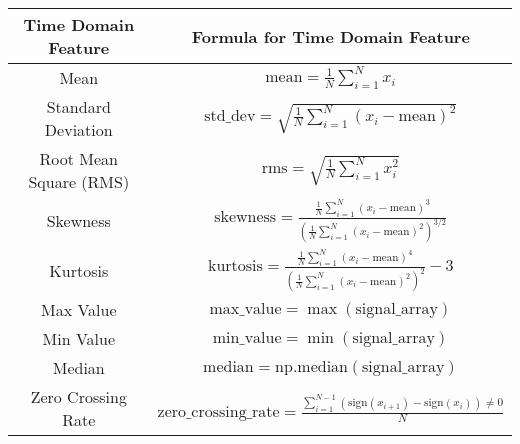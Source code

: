 \begin{table}[h]
    \centering
    \begin{tabular}{|c|c|}
        \hline
        \textbf{Time Domain Feature} & \textbf{Formula for Time Domain Feature}                                                                                                         \\
        \hline
        Mean                         & $\text{mean} = \frac{1}{N} \sum_{i=1}^{N} x_i$                                                                                                   \\
        \hline
        Standard Deviation           & $\text{std\_dev} = \sqrt{\frac{1}{N} \sum_{i=1}^{N} (x_i - \text{mean})^2}$                                                                      \\
        \hline
        Root Mean Square (RMS)       & $\text{rms} = \sqrt{\frac{1}{N} \sum_{i=1}^{N} x_i^2}$                                                                                           \\
        \hline
        Skewness                     & $\text{skewness} = \frac{\frac{1}{N} \sum_{i=1}^{N} (x_i - \text{mean})^3}{\left(\frac{1}{N} \sum_{i=1}^{N} (x_i - \text{mean})^2\right)^{3/2}}$ \\
        \hline
        Kurtosis                     & $\text{kurtosis} = \frac{\frac{1}{N} \sum_{i=1}^{N} (x_i - \text{mean})^4}{\left(\frac{1}{N} \sum_{i=1}^{N} (x_i - \text{mean})^2\right)^2} - 3$ \\
        \hline
        Max Value                    & $\text{max\_value} = \max(\text{signal\_array})$                                                                                                 \\
        \hline
        Min Value                    & $\text{min\_value} = \min(\text{signal\_array})$                                                                                                 \\
        \hline
        Median                       & $\text{median} = \text{np.median}(\text{signal\_array})$                                                                                         \\
        \hline
        Zero Crossing Rate           & $\text{zero\_crossing\_rate} = \frac{\sum_{i=1}^{N-1} (\text{sign}(x_{i+1}) - \text{sign}(x_i)) \neq 0}{N}$                                      \\
        \hline
    \end{tabular}
\end{table}
